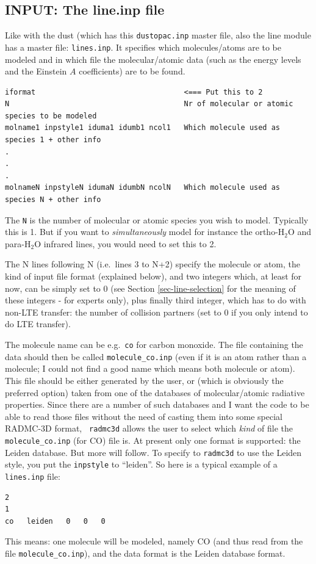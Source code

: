 \documentclass{report}
\newenvironment{asciibox}%
  {\begin{list}{}{%
    \setlength{\topsep}{0.5em}%
    \setlength{\parskip}{0em}%
    \setlength{\parsep}{0em}%
    \setlength{\itemsep}{0em}%
    \setlength{\rightmargin}{0em}%
    \setlength{\leftmargin}{3.0em}%
    \setlength{\labelsep}{1em}%
    \setlength{\labelwidth}{2em}%
  }\normalfont\footnotesize\item}
  {\end{list}}
\begin{document}
\subsection{INPUT: The line.inp file}
\label{sec-line-dot-inp}
%
Like with the dust (which has this {\small\tt dustopac.inp} master file,
also the line module has a master file: {\small\tt lines.inp}. It specifies
which molecules/atoms are to be modeled and in which file the
molecular/atomic data (such as the energy levels and the Einstein $A$
coefficients) are to be found.
\begin{asciibox}\begin{verbatim}
iformat                                  <=== Put this to 2
N                                        Nr of molecular or atomic species to be modeled
molname1 inpstyle1 iduma1 idumb1 ncol1   Which molecule used as species 1 + other info
.
.
.
molnameN inpstyleN idumaN idumbN ncolN   Which molecule used as species N + other info
\end{verbatim}\end{asciibox}

The {\small\tt N} is the number of molecular or atomic species you wish to
model. Typically this is 1. But if you want to {\em simultaneously} model
for instance the ortho-H$_2$O and para-H$_2$O infrared lines, you would need
to set this to 2.

The N lines following N (i.e.\ lines 3 to N+2) specify the molecule or atom,
the kind of input file format (explained below), and two integers which,
at least for now, can be simply set to 0 (see Section \ref{sec-line-selection}
for the meaning of these integers - for experts only), plus finally third
integer, which has to do with non-LTE transfer: the number of collision
partners (set to 0 if you only intend to do LTE transfer).

The molecule name can be e.g.\ {\small\tt co} for carbon monoxide. The file
containing the data should then be called {\small\tt molecule\_co.inp} (even
if it is an atom rather than a molecule; I could not find a good name which
means both molecule or atom). This file should be either generated by the
user, or (which is obviously the preferred option) taken from one of the
databases of molecular/atomic radiative properties. Since there are a number
of such databases and I want the code to be able to read those files without
the need of casting them into some special RADMC-3D format, {\small\tt
  radmc3d} allows the user to select which {\em kind} of file
the {\small\tt molecule\_co.inp} (for CO) file is. At present only one
format is supported: the Leiden database. But more will follow. To 
specify to {\small\tt radmc3d} to use the Leiden style, you put the
{\small\tt inpstyle} to ``leiden''. So here is a typical example of a
{\small\tt lines.inp} file:
\begin{asciibox}\begin{verbatim}
2
1
co   leiden   0   0   0 
\end{verbatim}\end{asciibox}
This means: one molecule will be modeled, namely CO (and thus read from the
file {\small\tt molecule\_co.inp}), and the data format is the Leiden
database format.
\end{document}
